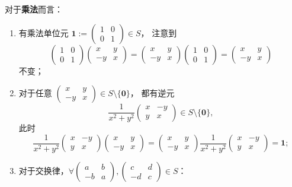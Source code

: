 \begin{question}
\begin{solution}
对于\textbf{乘法}而言：
\begin{enumerate}
  \item 有乘法单位元 \(\mathbf{1}:=\begin{pmatrix}1&0\\0&1\end{pmatrix}\in S\)，
  注意到
  \[
  \begin{pmatrix}1&0\\0&1\end{pmatrix}\begin{pmatrix}x&y\\-y&x\end{pmatrix}
  =\begin{pmatrix}x&y\\-y&x\end{pmatrix}\begin{pmatrix}1&0\\0&1\end{pmatrix}
  =\begin{pmatrix}x&y\\-y&x\end{pmatrix}
  \]
  不变；
  \item 对于任意 \(\begin{pmatrix}x&y\\-y&x\end{pmatrix}\in S\setminus\{\mathbf{0}\}\)，
  都有逆元
  \[
  \frac{1}{x^2+y^2}\begin{pmatrix}x&-y\\y&x\end{pmatrix}\in S\setminus\{\mathbf{0}\},
  \]
  此时
  \[
  \frac{1}{x^2+y^2}\begin{pmatrix}x&-y\\y&x\end{pmatrix}
  \begin{pmatrix}x&y\\-y&x\end{pmatrix}
  =\begin{pmatrix}x&y\\-y&x\end{pmatrix}
  \frac{1}{x^2+y^2}\begin{pmatrix}x&-y\\y&x\end{pmatrix}
  =\mathbf{1};
  \]
  \item 对于交换律，\(\forall\begin{pmatrix}a&b\\-b&a\end{pmatrix},
  \begin{pmatrix}c&d\\-d&c\end{pmatrix}\in S\)：

\end{enumerate}
\end{solution}
\end{question}
